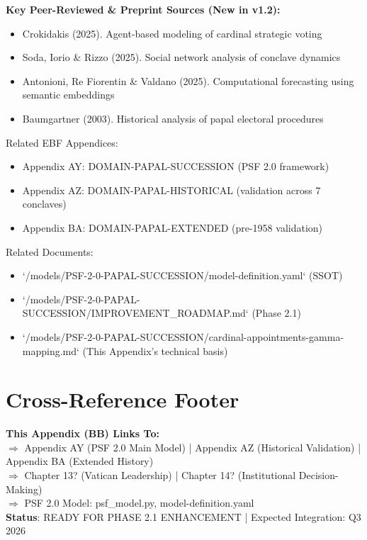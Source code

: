 \documentclass[11pt]{article}
\begin{document}
\noindent
\textbf{Key Peer-Reviewed & Preprint Sources (New in v1.2):}
\begin{itemize}
\item \nocite{crokidakis2025conclave} Crokidakis (2025). Agent-based modeling of cardinal strategic voting
\item \nocite{soda2025network} Soda, Iorio \& Rizzo (2025). Social network analysis of conclave dynamics
\item \nocite{antonioni2025totopapa} Antonioni, Re Fiorentin \& Valdano (2025). Computational forecasting using semantic embeddings
\item \nocite{baumgartner2003locked} Baumgartner (2003). Historical analysis of papal electoral procedures
\end{itemize}

\noindent
Related EBF Appendices:
\begin{itemize}
\item Appendix AY: DOMAIN-PAPAL-SUCCESSION (PSF 2.0 framework)
\item Appendix AZ: DOMAIN-PAPAL-HISTORICAL (validation across 7 conclaves)
\item Appendix BA: DOMAIN-PAPAL-EXTENDED (pre-1958 validation)
\end{itemize}

\noindent
Related Documents:
\begin{itemize}
\item `/models/PSF-2-0-PAPAL-SUCCESSION/model-definition.yaml` (SSOT)
\item `/models/PSF-2-0-PAPAL-SUCCESSION/IMPROVEMENT_ROADMAP.md` (Phase 2.1)
\item `/models/PSF-2-0-PAPAL-SUCCESSION/cardinal-appointments-gamma-mapping.md` (This Appendix's technical basis)
\end{itemize}

\section*{Cross-Reference Footer}

\begin{center}
\colorbox{yellow!20}{\begin{minipage}{0.95\textwidth}
\small
\textbf{This Appendix (BB) Links To:} \\
$\Rightarrow$ Appendix AY (PSF 2.0 Main Model) | Appendix AZ (Historical Validation) | Appendix BA (Extended History) \\
$\Rightarrow$ Chapter 13? (Vatican Leadership) | Chapter 14? (Institutional Decision-Making) \\
$\Rightarrow$ PSF 2.0 Model: psf\_model.py, model-definition.yaml \\
\textbf{Status}: READY FOR PHASE 2.1 ENHANCEMENT | Expected Integration: Q3 2026
\end{minipage}}
\end{center}
\end{document}

